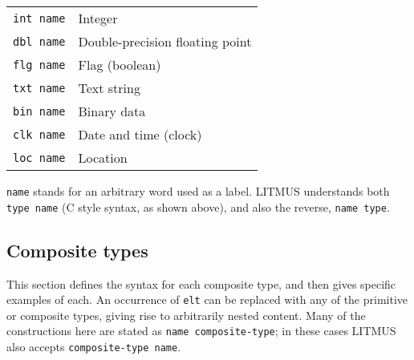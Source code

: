 \documentclass[12pt,a4paper,twoside]{article}
\renewcommand{\_}{\texttt{\symbol{95}}}
\begin{document}
\begin{tabular}{ll}
\texttt{int name} & Integer\\
\texttt{dbl name} & Double-precision floating point\\
\texttt{flg name} & Flag (boolean)\\
\texttt{txt name} & Text string\\
\texttt{bin name} & Binary data\\
\texttt{clk name} & Date and time (clock)\\
\texttt{loc name} & Location\\
\end{tabular}

\verb^name^ stands for an arbitrary word used as a label.
LITMUS understands both \verb^type name^ (C style syntax, as
shown above), and also the reverse, \verb^name type^.

\subsection{Composite types}

This section defines the syntax for each composite type, and then
gives specific examples of each. An occurrence of \verb^elt^ can be replaced
with any of the primitive or composite types, giving rise to
arbitrarily nested content. Many of the constructions here are
stated as \verb^name composite-type^; in these cases LITMUS also accepts
\verb^composite-type name^.
\end{document}
